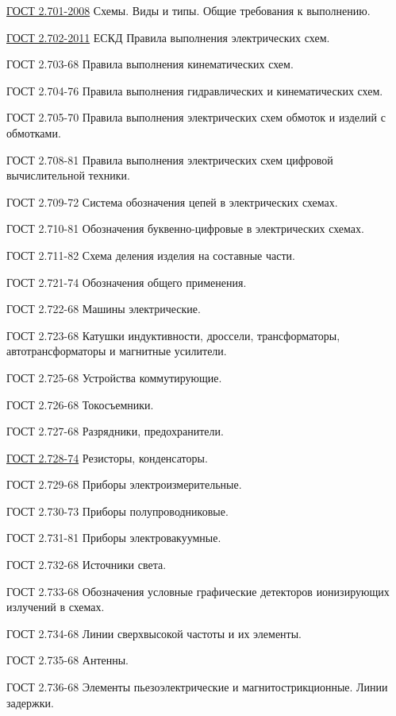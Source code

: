 \label{eskd}

\href{http://rtu.samgtu.ru/sites/rtu.samgtu.ru/files/GOST_ESKD_2.701-2008.pdf}{ГОСТ
2.701-2008} Схемы. Виды и типы. Общие требования к выполнению.

\href{http://www.gostedu.ru/51102.html}{ГОСТ 2.702-2011} ЕСКД
Правила выполнения электрических схем.

ГОСТ 2.703-68  Правила выполнения кинематических схем.

ГОСТ 2.704-76  Правила выполнения гидравлических и кинематических схем.

ГОСТ 2.705-70  Правила выполнения электрических схем обмоток и изделий с обмотками.

ГОСТ 2.708-81  Правила выполнения электрических схем цифровой вычислительной техники.

ГОСТ 2.709-72 Система обозначения цепей в электрических схемах.

ГОСТ 2.710-81 Обозначения буквенно-цифровые в электрических схемах.

ГОСТ 2.711-82 Схема деления изделия на составные части.

ГОСТ 2.721-74 Обозначения общего применения.

ГОСТ 2.722-68 Машины электрические.

ГОСТ 2.723-68 Катушки индуктивности, дроссели, трансформаторы, автотрансформаторы и магнитные усилители.

ГОСТ 2.725-68 Устройства коммутирующие.

ГОСТ 2.726-68 Токосъемники.

ГОСТ 2.727-68 Разрядники, предохранители.

\href{http://www.bmstu.ru/~rl1/courses/inform/gost2\_728-74.pdf}{ГОСТ 2.728-74}
Резисторы, конденсаторы.

ГОСТ 2.729-68 Приборы электроизмерительные.

ГОСТ 2.730-73 Приборы полупроводниковые.

ГОСТ 2.731-81 Приборы электровакуумные.

ГОСТ 2.732-68 Источники света.

ГОСТ 2.733-68 Обозначения условные графические детекторов ионизирующих излучений в схемах.

ГОСТ 2.734-68 Линии сверхвысокой частоты и их элементы.

ГОСТ 2.735-68 Антенны.

ГОСТ 2.736-68 Элементы пьезоэлектрические и магнитострикционные. Линии задержки.

